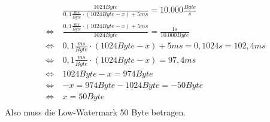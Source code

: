 \documentclass{ti2}
\begin{document}
\begin{align*}
& \frac{1024 Byte}{0,1 \frac{ms}{Byte} \cdot (1024 Byte - x)+5ms}= 10.000 \frac{Byte}{s}\\
\Leftrightarrow\ & \frac{0,1 \frac{ms}{Byte} \cdot (1024 Byte - x)+5ms}{1024 Byte}= \frac{1 s}{10.000 Byte}\\
\Leftrightarrow\ & 0,1 \frac{ms}{Byte} \cdot (1024 Byte - x)+5ms= 0,1024 s = 102,4 ms \\
\Leftrightarrow\ & 0,1 \frac{ms}{Byte} \cdot (1024 Byte - x)= 97,4 ms \\
\Leftrightarrow\ & 1024 Byte - x = 974 Byte \\
\Leftrightarrow\ & -x = 974 Byte -1024 Byte=-50 Byte \\
\Leftrightarrow\ & x = 50 Byte \\
\end{align*}
Also muss die Low-Watermark 50 Byte betragen.
\end{document}
